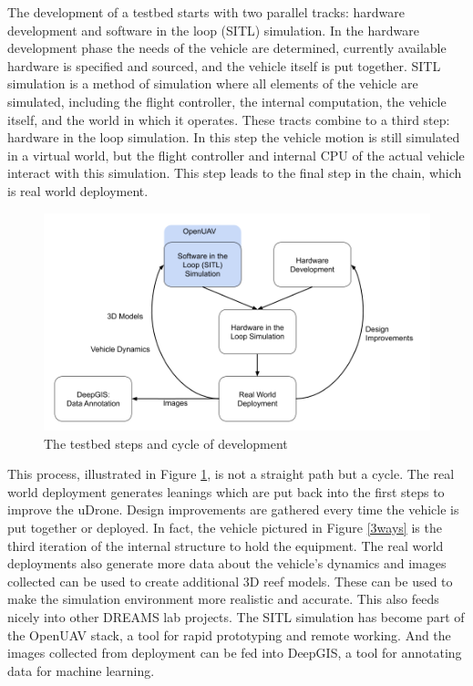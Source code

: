 The development of a testbed starts with two parallel tracks: hardware development and software in the loop (SITL) simulation. In the hardware development phase the needs of the vehicle are determined, currently available hardware is specified and sourced, and the vehicle itself is put together. SITL simulation is a method of simulation where all elements of the vehicle are simulated, including the flight controller, the internal computation, the vehicle itself, and the world in which it operates. These tracts combine to a third step: hardware in the loop simulation. In this step the vehicle motion is still simulated in a virtual world, but the flight controller and internal CPU of the actual vehicle interact with this simulation. This step leads to the final step in the chain, which is real world deployment.

\begin{figure}[ht]
    \centering
    \includegraphics[width=\maxwidth{\textwidth}]{img/testbed.png}
    \caption{The testbed steps and cycle of development}
    \label{testbed}
\end{figure}

This process, illustrated in Figure \ref{testbed}, is not a straight path but a cycle. The real world deployment generates leanings which are put back into the first steps to improve the uDrone. Design improvements are gathered every time the vehicle is put together or deployed. In fact, the vehicle pictured in Figure \ref{3ways} is the third iteration of the internal structure to hold the equipment. The real world deployments also generate more data about the vehicle's dynamics and images collected can be used to create additional 3D reef models. These can be used to make the simulation environment more realistic and accurate. This also feeds nicely into other DREAMS lab projects. The SITL simulation has become part of the OpenUAV stack, a tool for rapid prototyping and remote working. And the images collected from deployment can be fed into DeepGIS, a tool for annotating data for machine learning. 

